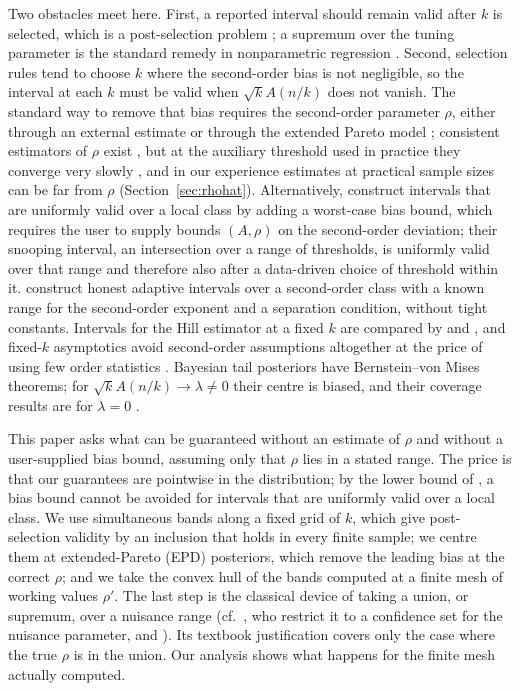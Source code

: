 \documentclass[11pt]{article}
\theoremstyle{definition}
\theoremstyle{remark}
\numberwithin{equation}{section}
\begin{document}
Two obstacles meet here. First, a reported interval should remain valid after $k$ is selected, which is a post-selection problem \citep{berk2013}; a supremum over the tuning parameter is the standard remedy in nonparametric regression \citep{armstrongkolesar2018snoop}. Second, selection rules tend to choose $k$ where the second-order bias is not negligible, so the interval at each $k$ must be valid when $\sqrt{k}A(n/k)$ does not vanish. The standard way to remove that bias requires the second-order parameter $\rho$, either through an external estimate \citep{gomesmartins2002,cgp2005} or through the extended Pareto model \citep{bjs2009}; consistent estimators of $\rho$ exist \citep{fagh2003}, but at the auxiliary threshold used in practice they converge very slowly \citep[\S2]{cgp2005}, and in our experience estimates at practical sample sizes can be far from $\rho$ (Section~\ref{sec:rhohat}). Alternatively, \citet{sasakiwang2024} construct intervals that are uniformly valid over a local class by adding a worst-case bias bound, which requires the user to supply bounds $(A,\rho)$ on the second-order deviation; their snooping interval, an intersection over a range of thresholds, is uniformly valid over that range and therefore also after a data-driven choice of threshold within it. \citet{carpentierkim2014} construct honest adaptive intervals over a second-order class with a known range for the second-order exponent and a separation condition, without tight constants. Intervals for the Hill estimator at a fixed $k$ are compared by \citet{chengpeng2001} and \citet{haeuslersegers2007}, and fixed-$k$ asymptotics avoid second-order assumptions altogether at the price of using few order statistics \citep{mullerwang2017}. Bayesian tail posteriors have Bernstein--von Mises theorems; for $\sqrt{k}A(n/k)\to\lambda\neq0$ their centre is biased, and their coverage results are for $\lambda=0$ \citep{dombry2023}.

This paper asks what can be guaranteed without an estimate of $\rho$ and without a user-supplied bias bound, assuming only that $\rho$ lies in a stated range. The price is that our guarantees are pointwise in the distribution; by the lower bound of \citet[Theorem~1]{sasakiwang2024}, a bias bound cannot be avoided for intervals that are uniformly valid over a local class. We use simultaneous bands along a fixed grid of $k$, which give post-selection validity by an inclusion that holds in every finite sample; we centre them at extended-Pareto (EPD) posteriors, which remove the leading bias at the correct $\rho$; and we take the convex hull of the bands computed at a finite mesh of working values $\rho'$. The last step is the classical device of taking a union, or supremum, over a nuisance range (cf.\ \citealp{bergerboos1994}, who restrict it to a confidence set for the nuisance parameter, and \citealp{silvapulle1996}). Its textbook justification covers only the case where the true $\rho$ is in the union. Our analysis shows what happens for the finite mesh actually computed.
\end{document}
